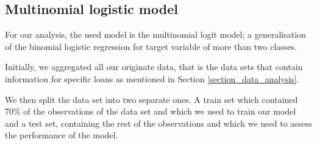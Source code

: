 \subsection{Multinomial logistic model}
    For our analysis, the used model is the multinomial logit model; 
    a generalisation of the binomial logistic regression for target 
    variable of more than two classes.
    

    Initially, we aggregated all our originate data, that is the data 
    sets that contain information for specific loans as mentioned in 
    Section \ref{section_data_analysis}.

    We then split the data set into two separate ones. A train set 
    which contained 70\% of the observations of the data set and which 
    we used to train our model and a test set, containing the rest of 
    the observations and which we used to assess the performance of the 
    model.




